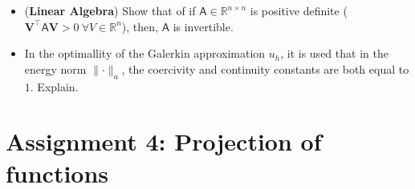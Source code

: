 \begin{kaobox}[frametitle=Solve the following exercices]
\begin{itemize}

\item (\textbf{Linear Algebra}) Show that of if $\mathsf{A} \in \mathbb{R}^{n\times n}$ is
positive definite ($\mathbf{V}^{\intercal} \mathsf{A} \mathbf{V} > 0~\forall V \in \mathbb{R}^n$),
then, $\mathsf{A}$ is invertible.\\

\item In the optimallity of the Galerkin approximation $u_h$, it is
used that in the energy norm $\lVert \cdot \rVert_a$,
the coercivity and continuity constants are both equal to $1$. Explain. \\

\end{itemize}
\end{kaobox}

\section{{\color{gray!50!yellow} Assignment 4: Projection of functions}}

